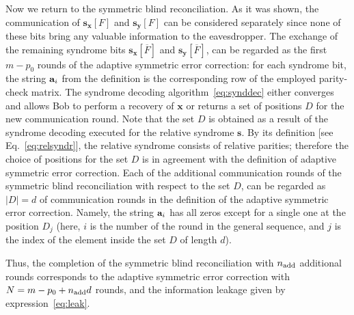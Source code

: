 \documentclass[aps,pra,twocolumn,amsmath,amssymb,nofootinbib,showpacs,superscriptaddress]{revtex4-1}
\renewcommand{\sb}{\mathbf{s}}
\newcommand{\xb}{\mathbf{x}}
\newcommand{\yb}{\mathbf{y}}
\begin{document}
Now we return to the symmetric blind reconciliation.
As it was shown, the communication of $\sb_\xb[F]$ and $\sb_\yb[F]$ can be considered separately since none of these bits bring any valuable information to the eavesdropper.
The exchange of the remaining syndrome bits $\sb_\xb[\overline{F}]$ and $\sb_\yb[\overline{F}]$, can be regarded as the first $m-p_0$ rounds of the adaptive symmetric error correction: 
for each syndrome bit, the string ${\bf a}_i$ from the definition is the corresponding row of the employed parity-check matrix.
The syndrome decoding algorithm~\eqref{eq:synddec} either converges and allows Bob to perform a recovery of $\xb$ or returns a set of positions $D$ for the new communication round.
Note that the set $D$ is obtained as a result of the syndrome decoding executed for the relative syndrome $\sb$.
By its definition [see Eq.~\eqref{eq:relsyndr}], the relative syndrome consists of relative parities;
therefore the choice of positions for the set $D$ is in agreement with the definition of adaptive symmetric error correction.
Each of the additional communication rounds of the symmetric blind reconciliation with respect to the set $D$, 
can be regarded as $|D|=d$ of communication rounds in the definition of the adaptive symmetric error correction.
Namely, the string ${\bf a}_i$ has all zeros except for a single one at the position $D_j$ (here, $i$ is the number of the round in the general sequence, 
and $j$ is the index of the element inside the set $D$ of length $d$).

Thus, the completion of the symmetric blind reconciliation with $n_{\rm add}$ additional rounds corresponds to the adaptive symmetric error correction with $N=m-p_0+n_{\rm add}d$ rounds, 
and the information leakage given by expression~\eqref{eq:leak}.

\medskip
\end{document}
